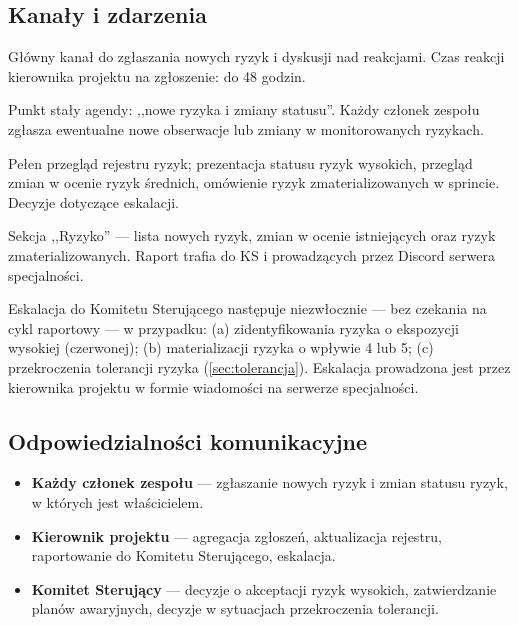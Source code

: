 \documentclass[11pt,a4paper]{article}
\begin{document}
	\subsection{Kanały i zdarzenia}
	\begin{description}[style=nextline]
		\item[Kanał \texttt{\#ryzyka} na Discord]
		Główny kanał do zgłaszania nowych ryzyk i dyskusji nad reakcjami. Czas reakcji kierownika projektu na zgłoszenie: do 48 godzin.
		
		\item[Stand-up tygodniowy]
		Punkt stały agendy: ,,nowe ryzyka i zmiany statusu''. Każdy członek zespołu zgłasza ewentualne nowe obserwacje lub zmiany w monitorowanych ryzykach.
		
		\item[Przegląd końca sprintu (z udziałem KS)]
		Pełen przegląd rejestru ryzyk; prezentacja statusu ryzyk wysokich, przegląd zmian w ocenie ryzyk średnich, omówienie ryzyk zmaterializowanych w sprincie. Decyzje dotyczące eskalacji.
		
		\item[Raport końca sprintu]
		Sekcja ,,Ryzyko'' --- lista nowych ryzyk, zmian w ocenie istniejących oraz ryzyk zmaterializowanych. Raport trafia do KS i prowadzących przez Discord serwera specjalności.
		
		\item[Eskalacja]
		Eskalacja do Komitetu Sterującego następuje niezwłocznie --- bez czekania na cykl raportowy --- w przypadku: (a) zidentyfikowania ryzyka o ekspozycji wysokiej (czerwonej); (b) materializacji ryzyka o wpływie 4 lub 5; (c) przekroczenia tolerancji ryzyka (\cref{sec:tolerancja}). Eskalacja prowadzona jest przez kierownika projektu w formie wiadomości na serwerze specjalności.
	\end{description}
	
	\subsection{Odpowiedzialności komunikacyjne}
	\begin{itemize}[noitemsep]
		\item \textbf{Każdy członek zespołu} --- zgłaszanie nowych ryzyk i zmian statusu ryzyk, w których jest właścicielem.
		\item \textbf{Kierownik projektu} --- agregacja zgłoszeń, aktualizacja rejestru, raportowanie do Komitetu Sterującego, eskalacja.
		\item \textbf{Komitet Sterujący} --- decyzje o akceptacji ryzyk wysokich, zatwierdzanie planów awaryjnych, decyzje w sytuacjach przekroczenia tolerancji.
	\end{itemize}
	
\end{document}
